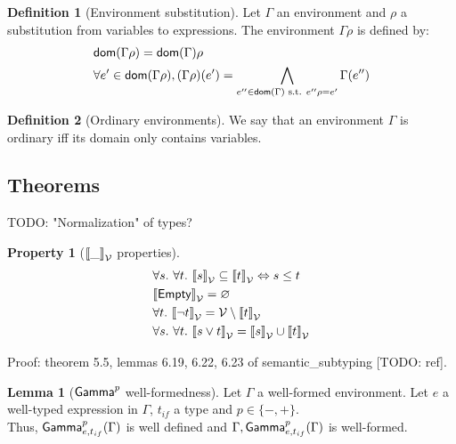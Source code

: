 \documentclass[a4paper]{article}
\theoremstyle{definition}
\newtheorem{lemma}{Lemma}
\newtheorem{definition}{Definition}
\newtheorem{property}{Property}
\begin{document}
      \begin{definition}[Environment substitution]
        Let $\Gamma$ an environment and $\rho$ a substitution from variables to expressions.
        The environment $\Gamma\rho$ is defined by:
        \begin{align*}
          &\textsf{dom}(\Gamma\rho) = \textsf{dom}(\Gamma) \rho\\
          &\forall e' \in \textsf{dom}(\Gamma\rho), (\Gamma\rho)(e') = \bigwedge_{e'' \in \textsf{dom}(\Gamma) \text{ s.t. } e''\rho=e'}\Gamma(e'')
        \end{align*}
      \end{definition}
    
      \begin{definition}[Ordinary environments]
        We say that an environment $\Gamma$ is ordinary iff its domain only contains variables.
      \end{definition}
    
        \subsection{Theorems}

        TODO: "Normalization" of types?

        \begin{property}[${\llbracket \_ \rrbracket}_{\mathcal{V}}$ properties]
          \begin{align*}
            &\forall s.\ \forall t.\ {\llbracket s \rrbracket}_{\mathcal{V}} \subseteq {\llbracket t \rrbracket}_{\mathcal{V}} \Leftrightarrow s \leq t\\
            &{\llbracket \textsf{Empty} \rrbracket}_{\mathcal{V}} = \varnothing\\
            &\forall t.\ {\llbracket \neg t \rrbracket}_{\mathcal{V}} = \mathcal{V} \setminus {\llbracket t \rrbracket}_{\mathcal{V}}\\
            &\forall s.\ \forall t.\ {\llbracket s\vee t \rrbracket}_{\mathcal{V}} = {\llbracket s \rrbracket}_{\mathcal{V}} \cup {\llbracket t \rrbracket}_{\mathcal{V}}
          \end{align*}
        \end{property}
        Proof: theorem 5.5, lemmas 6.19, 6.22, 6.23 of semantic_subtyping [TODO: ref].

        \begin{lemma}[$\textsf{Gamma}^{p}_{} $ well-formedness]
          Let $\Gamma$ a well-formed environment. Let $e$ a well-typed expression in $\Gamma$, $t_{if}$ a type and $p\in\{-,+\}$.\\
          Thus, $\textsf{Gamma}^{p}_{e,t_{if}}(\Gamma)$ is well defined and $\Gamma,\textsf{Gamma}^{p}_{e,t_{if}}(\Gamma)$ is well-formed.
        \end{lemma}
\end{document}
